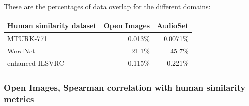 These are the percentages of data overlap for the different domains:

\begin{table}[H]
\centering
\begin{tabular}{lrr}
\toprule
{Human similarity dataset} &  Open Images &   AudioSet\\
\midrule
MTURK-771    &     0.013\% &  0.0071\%  \\
WordNet    &     21.1\% &  45.7\%  \\
enhanced ILSVRC    &    0.115\% &  0.221\% \\
\bottomrule
\end{tabular}
\centering
\end{table}

\subsubsection{Open Images, Spearman correlation with human similarity metrics}

